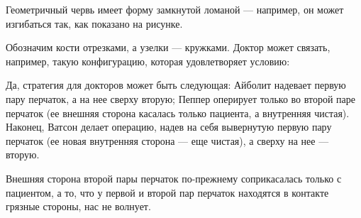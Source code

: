 ﻿
\begin{itemize}

\itA Геометричный червь имеет форму замкнутой ломаной — например, он может изгибаться так, как показано на рисунке.

\begin{center}  \end{center}

\itB Обозначим кости отрезками, а узелки — кружками. Доктор может связать, например, такую конфигурацию, которая удовлетворяет условию:

\begin{center}  \end{center}

\itC Да, стратегия для докторов может быть следующая: Айболит надевает первую пару перчаток, а на нее сверху вторую; Пеппер оперирует только во второй паре перчаток (ее внешняя сторона касалась только пациента, а внутренняя чистая). Наконец, Ватсон делает операцию, надев на себя вывернутую первую пару перчаток (ее новая внутренняя сторона — еще чистая), а сверху на нее — вторую.

Внешняя сторона второй пары перчаток по-прежнему соприкасалась только с пациентом, а то, что у первой и второй пар перчаток находятся в контакте грязные стороны, нас не волнует.
\end{itemize}